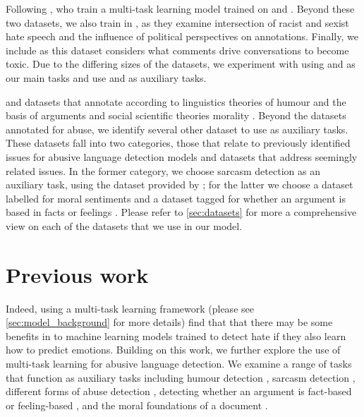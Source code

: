 Following \citet{Waseem:2018}, who train a multi-task learning model trained on \citet{Waseem-Hovy:2016} and \citet{Davidson:2017}. Beyond these two datasets, we also train in \citet{Waseem:2016}, as they examine intersection of racist and sexist hate speech and the influence of political perspectives on annotations. Finally, we include \citet{Wulczyn:2017} as this dataset considers what comments drive conversations to become toxic. Due to the differing sizes of the datasets, we experiment with using \citet{Wulczyn:2017} and \citet{Davidson:2017} as our main tasks and use \citet{Waseem:2016} and \citet{Waseem-Hovy:2016} as auxiliary tasks.

and datasets that annotate according to linguistics theories of humour \cite{Oraby_sarcasm:2017} and the basis of arguments \cite{Oraby_fact_feel:2017} and social scientific theories morality \cite{Hoover:2019}.\vspace{5mm}
Beyond the datasets annotated for abuse, we identify several other dataset to use as auxiliary tasks. These datasets fall into two categories, those that relate to previously identified issues for abusive language detection models and datasets that address seemingly related issues. In the former category, we choose sarcasm detection as an auxiliary task, using the dataset provided by \citet{Oraby_sarcasm:2017}; for the latter we choose a dataset labelled for moral sentiments \citet{Hoover:2019} and a dataset tagged for whether an argument is based in facts or feelings \citet{Oraby_fact_feel:2017}. Please refer to \autoref{sec:datasets} for more a comprehensive view on each of the datasets that we use in our model.

\section{Previous work}



Indeed, using a multi-task learning framework (please see \autoref{sec:model_background} for more details) \citet{Mishra:2020} find that that there may be some benefits in to machine learning models trained to detect hate if they also learn how to predict emotions. Building on this work, we further explore the use of multi-task learning for abusive language detection. We examine a range of tasks that function as auxiliary tasks including humour detection \cite{CITE: HUMOUR DETECTION}, sarcasm detection \cite{Oraby_sarcasm:2017}, different forms of abuse detection \cite{Waseem-Hovy:2016,Waseem:2016,Davidson:2017,Wulczyn:2017}, detecting whether an argument is fact-based or feeling-based \cite{Oraby_fact_feel:2017}, and the moral foundations of a document \cite{Hoover:2019}.


